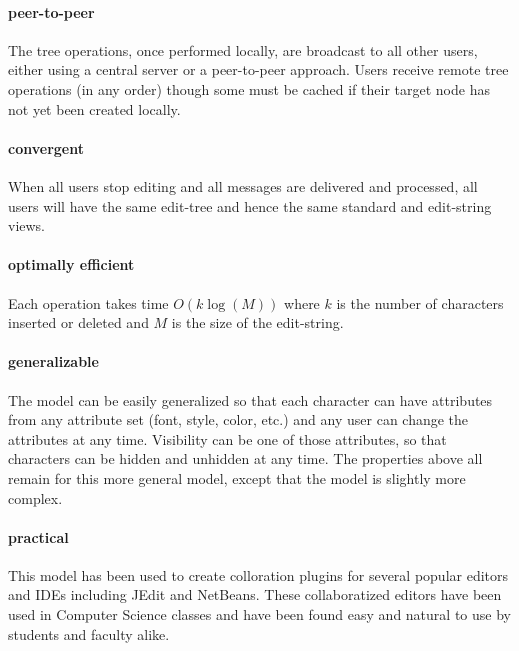 \documentclass{amsart}
\begin{document}
\paragraph{\bf peer-to-peer}
The tree operations, once performed locally, are broadcast
to all other users, either using a central server or a peer-to-peer approach.
Users receive remote tree operations (in any order) though some must
be cached if their target node has not yet been created locally.

\paragraph{\bf convergent} 
When all users stop editing and all messages are delivered and processed, all
users will have the same edit-tree and hence the same standard and edit-string
views.

\paragraph{\bf optimally efficient}
Each operation takes time $O(k\log(M))$ where $k$ is the number of characters
inserted or deleted and $M$ is the size of the edit-string.

\paragraph{\bf generalizable}
The model can be easily generalized so that each character can have attributes
from any attribute set (font, style, color, etc.) and any user can change the
attributes at any time. Visibility can be one of those attributes, so that 
characters can be hidden and unhidden at any time. The properties above 
all remain for this more general model, except that the model is slightly
more complex.

\paragraph{\bf practical} 
This model has been used to create colloration plugins for several
popular editors and IDEs including JEdit and NetBeans. These
collaboratized editors have been used in Computer Science classes
and have been found easy and natural to use by students and faculty
alike.
\end{document}
